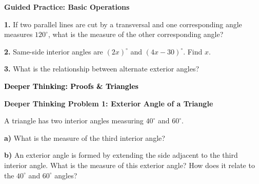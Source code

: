 \documentclass[12pt, letterpaper, fleqn]{article}
\begin{document}
\begin{tcolorbox}[colback=white!15, colframe=black, boxrule=1.5pt, arc=4mm, left=6mm, right=6mm, top=5mm, bottom=5mm]

\textbf{Guided Practice: Basic Operations}

\medskip

\noindent
\textbf{1.} If two parallel lines are cut by a transversal and one corresponding angle measures $120^\circ$, what is the measure of the other corresponding angle?
\vspace{1.5cm}

\noindent
\textbf{2.} Same-side interior angles are $(2x)^\circ$ and $(4x - 30)^\circ$. Find $x$.
\vspace{2.5cm}

\noindent
\textbf{3.} What is the relationship between alternate exterior angles?
\vspace{1.5cm}

\end{tcolorbox}

\newpage

\begin{tcolorbox}[colback=customteal!20]
\large\textcolor{black}{\textbf{Deeper Thinking: Proofs \& Triangles}}
\end{tcolorbox}

\vspace{3mm}

\begin{tcolorbox}[colback=white!15, colframe=black, boxrule=1.5pt, arc=4mm, left=6mm, right=6mm, top=5mm, bottom=5mm]

\textbf{Deeper Thinking Problem 1: Exterior Angle of a Triangle}

\medskip

\noindent
A triangle has two interior angles measuring $40^\circ$ and $60^\circ$. 

\vspace{5mm}

\noindent
\textbf{a)} What is the measure of the third interior angle?

\vspace{2.5cm}

\noindent
\textbf{b)} An exterior angle is formed by extending the side adjacent to the third interior angle. What is the measure of this exterior angle? How does it relate to the $40^\circ$ and $60^\circ$ angles?

\vspace{3cm}

\end{tcolorbox}
\end{document}
